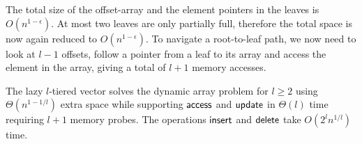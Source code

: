 The total size of the offset-array and the element pointers in the leaves is $O(n^{1-\epsilon})$. At most two leaves are only partially full, therefore the
total space is now again reduced to $O(n^{1-\epsilon})$. To navigate a root-to-leaf path, we now need to look at $l - 1$ offsets, follow a pointer from a leaf to its array and access the element in the array, giving a total of $l + 1$
memory accesses.

\begin{theorem}
        The lazy $l$-tiered vector solves the dynamic array problem for $l \geq 2$ using
        $\Theta(n^{1-1/l})$ extra space while supporting $\mathsf{access}$ and
        $\mathsf{update}$ in $\Theta(l)$ time requiring $l+1$ memory probes. The
        operations $\mathsf{insert}$ and $\mathsf{delete}$ take $O(2^l n^{1/l})$
        time.
\label{thm:lazy}
\end{theorem}

